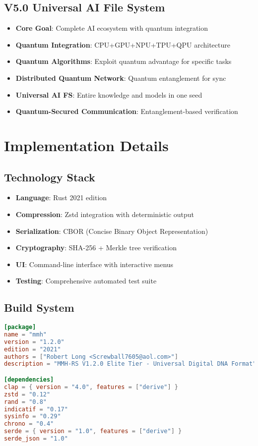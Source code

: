 \documentclass[12pt,a4paper]{article}
\begin{document}
\subsection{V5.0 Universal AI File System}
\begin{itemize}
    \item \textbf{Core Goal}: Complete AI ecosystem with quantum integration
    \item \textbf{Quantum Integration}: CPU+GPU+NPU+TPU+QPU architecture
    \item \textbf{Quantum Algorithms}: Exploit quantum advantage for specific tasks
    \item \textbf{Distributed Quantum Network}: Quantum entanglement for sync
    \item \textbf{Universal AI FS}: Entire knowledge and models in one seed
    \item \textbf{Quantum-Secured Communication}: Entanglement-based verification
\end{itemize}

\newpage

\section{Implementation Details}

\subsection{Technology Stack}
\begin{itemize}
    \item \textbf{Language}: Rust 2021 edition
    \item \textbf{Compression}: Zstd integration with deterministic output
    \item \textbf{Serialization}: CBOR (Concise Binary Object Representation)
    \item \textbf{Cryptography}: SHA-256 + Merkle tree verification
    \item \textbf{UI}: Command-line interface with interactive menus
    \item \textbf{Testing}: Comprehensive automated test suite
\end{itemize}

\subsection{Build System}
\begin{lstlisting}[language=TOML, caption=Cargo Configuration]
[package]
name = "mmh"
version = "1.2.0"
edition = "2021"
authors = ["Robert Long <Screwball7605@aol.com>"]
description = "MMH-RS V1.2.0 Elite Tier - Universal Digital DNA Format"

[dependencies]
clap = { version = "4.0", features = ["derive"] }
zstd = "0.12"
rand = "0.8"
indicatif = "0.17"
sysinfo = "0.29"
chrono = "0.4"
serde = { version = "1.0", features = ["derive"] }
serde_json = "1.0"
\end{lstlisting}
\end{document}
